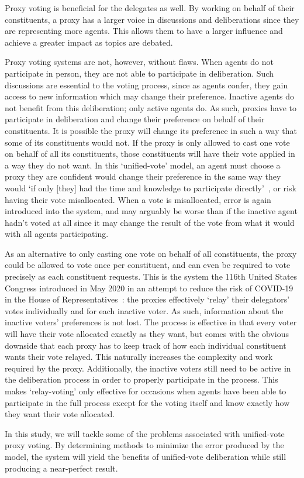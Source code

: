Proxy voting is beneficial for the delegates as well.
By working on behalf of their constituents, a proxy has a larger voice in discussions
and deliberations since they are representing more agents.
This allows them to have a larger influence and achieve a greater impact as topics
are debated.

Proxy voting systems are not, however, without flaws.
When agents do not participate in person, they are not able to participate in
deliberation.
Such discussions are essential to the voting process, since as agents confer, they
gain access to new information which may change their preference.
Inactive agents do not benefit from this deliberation;
only active agents do.
As such, proxies have to participate in deliberation and change their preference on
behalf of their constituents.
It is possible the proxy will change its preference in such a way that some of its
constituents would not.
If the proxy is only allowed to cast one vote    on behalf of all its constituents, those
constituents will have their vote applied in a way they do not want.
In this `unified-vote' model, an agent must choose a proxy they are confident would
change their preference in the same way they would `if only [they] had the time and
knowledge to participate directly'~\cite{Miller1969}, or risk having their vote
misallocated.
When a vote is misallocated, error is again introduced into the system, and may
arguably be worse than if the inactive agent hadn't voted at all since it may change
the result of the vote from what it would with all agents participating.

As an alternative to only casting one vote on behalf of all constituents, the proxy
could be allowed to vote once per constituent, and can even be required to vote
precisely as each constituent requests.
This is the system the 116th United States Congress introduced in May 2020 in an
attempt to reduce the risk of COVID-19 in the House of
Representatives~\cite{CERP2020, Congress.gov2020}: the proxies effectively `relay' their
delegators' votes individually and for each inactive voter.
As such, information about the inactive voters' preferences is not lost.
The process is effective in that every voter will have their vote allocated exactly
as they want, but comes with the obvious downside   that each proxy has to keep track
of how each individual constituent wants their vote relayed.
This naturally increases the complexity and work required by the proxy.
Additionally, the inactive voters still need to be active in the deliberation process
in order to properly participate in the process.
This makes `relay-voting' only effective for occasions when agents have been able to
participate in the full process except for the voting itself and know exactly how
they want their vote allocated.

In this study, we will tackle some of the problems associated with unified-vote proxy
voting.
By determining methods to minimize the error produced by the model, the system will
yield the benefits of unified-vote deliberation while still producing a near-perfect
result.
